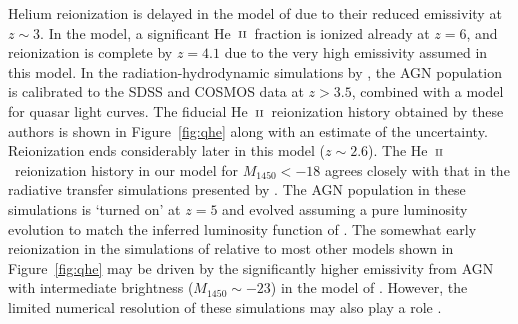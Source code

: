 \documentclass[fleqn,usenatbib]{mnras}
\def\HeII{\hbox{He~$\scriptstyle\rm II$}}
\begin{document}
Helium reionization is delayed in the model of
\citet{2012ApJ...746..125H} due to their reduced emissivity at $z\sim
3$.  In the \citet{2015ApJ...813L...8M} model, a significant
\HeII\ fraction is ionized already at $z=6$, and reionization is
complete by $z=4.1$ due to the very high emissivity assumed in this
model.  In the radiation-hydrodynamic simulations by
\citet{2016ApJ...828...90L}, the AGN population is calibrated to the
SDSS \citep{2013ApJ...768..105M} and COSMOS
\citep{2012ApJ...755..169M} data at $z>3.5$, combined with a model for
quasar light curves.  The fiducial \HeII\ reionization history
obtained by these authors is shown in Figure~\ref{fig:qhe} along with
an estimate of the uncertainty.  Reionization ends considerably later
in this model ($z\sim 2.6$).  The \HeII\ reionization history in our
model for $M_\mathrm{1450}<-18$ agrees closely with that in the
radiative transfer simulations presented by
\citet{2014MNRAS.445.4186C}.  The AGN population in these simulations
is `turned on' at $z=5$ and evolved assuming a pure luminosity
evolution to match the inferred luminosity function of
\citet{2011ApJ...728L..26G}.  The somewhat early reionization in the
simulations of \citet{2014MNRAS.445.4186C} relative to most other
models shown in Figure~\ref{fig:qhe} may be driven by the
significantly higher emissivity from AGN with intermediate brightness
($M_{1450}\sim -23$) in the model of \citet{2011ApJ...728L..26G}.
However, the limited numerical resolution of these simulations may
also play a role \citep{2014MNRAS.445.4186C}.
\end{document}
